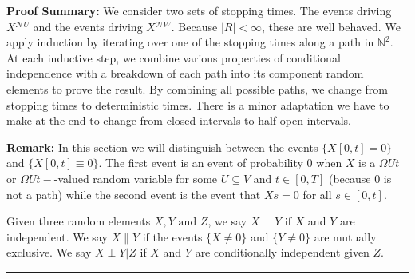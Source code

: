 \documentclass[12pt]{article}
\newcommand{\skipLine}{\vspace{12pt}}
\newcommand{\mb}{\mathbb}
\newcommand{\mc}{\mathcal}
\newcommand{\te}{\text}
\newcommand{\pfsum}{\textbf{Proof Summary: }}
\newcommand{\ind}{\hspace{24pt}}
\newcommand{\lin}{\rule{\linewidth}{0.4 pt}}
\renewcommand{\U}{U}							%
\newcommand{\UU}{W}								%
\newcommand{\UUU}{R}							%
\newcommand{\T}{T}								%
\renewcommand{\t}{t}							%
\renewcommand{\tt}{s}							%
\newcommand{\X}{X}								%
\newcommand{\neigh}{\mc{N}}						%
\newcommand{\XX}{Y}								%
\newcommand{\XXX}{Z}							%
\newcommand{\mutex}{\|}							%
\begin{document}
\pfsum We consider two sets of stopping times. The events driving \(\X{}{}^{\neigh{\U}}\) and the events driving \(\X{}{}^{\neigh{\UU}}\). Because \(|\UUU| < \infty\), these are well behaved. We apply induction by iterating over one of the stopping times along a path in \(\mb{N}^2\). At each inductive step, we combine various properties of conditional independence with a breakdown of each path into its component random elements to prove the result. By combining all possible paths, we change from stopping times to deterministic times. There is a minor adaptation we have to make at the end to change from closed intervals to half-open intervals.

\skipLine

\textbf{Remark:} In this section we will distinguish between the events \(\{\X{}{[0,\t]} = 0\}\) and \(\{\X{}{[0,\t]}\equiv 0\}\). The first event is an event of probability 0 when \(\X{}{}\) is a \(\Omega{\U}{\t}\) or \(\Omega{\U}{\t-}\)-valued random variable for some \(\U\subseteq  V\) and \(\t \in [0,\T]\) (because 0 is not a path) while the second event is the event that \(\X{}{\tt} = 0\) for all \(\tt \in [0,\t]\).

\ind Given three random elements \(\X{}{},\XX{}{} \te{ and } \XXX{}{}\), we say \(\X{}{}\perp \XX{}{}\) if \(\X{}{}\) and \(\XX{}{}\) are independent. We say \(\X{}{}\mutex \XX{}{}\) if the events \(\{\X{}{}\neq 0\}\) and \(\{\XX{}{} \neq 0\}\) are mutually exclusive. We say \(\X{}{}\perp \XX{}{}|\XXX{}{}\) if \(\X{}{}\) and \(\XX{}{}\) are conditionally independent given \(\XXX{}{}\).

\lin
\end{document}
